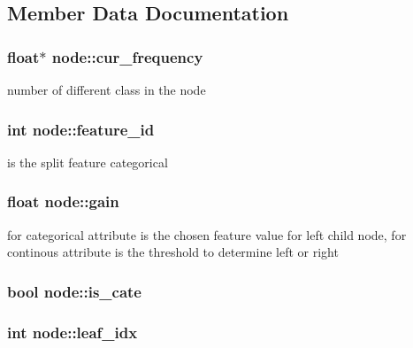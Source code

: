 \subsection{Member Data Documentation}
\hypertarget{classnode_ae4125b554711d8ad9d6726ffd69e0b77}{
\subsubsection[{cur\+\_\+frequency}]{\setlength{\rightskip}{0pt plus 5cm}float$\ast$ node\+::cur\+\_\+frequency}}\label{classnode_ae4125b554711d8ad9d6726ffd69e0b77}
number of different class in the node \hypertarget{classnode_ad65aefa2c967c82cd88e6870085d7f3e}{
\subsubsection[{feature\+\_\+id}]{\setlength{\rightskip}{0pt plus 5cm}int node\+::feature\+\_\+id}}\label{classnode_ad65aefa2c967c82cd88e6870085d7f3e}
is the split feature categorical \hypertarget{classnode_a7154054210920a77711f8ddb0cf45941}{
\subsubsection[{gain}]{\setlength{\rightskip}{0pt plus 5cm}float node\+::gain}}\label{classnode_a7154054210920a77711f8ddb0cf45941}
for categorical attribute is the chosen feature value for left child node, for continous attribute is the threshold to determine left or right \hypertarget{classnode_a67c3c0be5001ace8494a6292e8079001}{
\subsubsection[{is\+\_\+cate}]{\setlength{\rightskip}{0pt plus 5cm}bool node\+::is\+\_\+cate}}\label{classnode_a67c3c0be5001ace8494a6292e8079001}
\hypertarget{classnode_abbd7d4174869fead5f901b042a2f9712}{
\subsubsection[{leaf\+\_\+idx}]{\setlength{\rightskip}{0pt plus 5cm}int node\+::leaf\+\_\+idx}}\label{classnode_abbd7d4174869fead5f901b042a2f9712}
